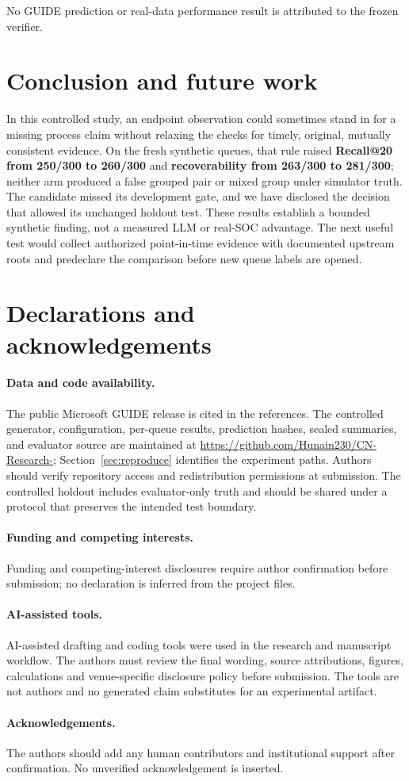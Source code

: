 \documentclass[pdflatex,sn-mathphys-num,iicol]{sn-jnl}
\begin{document}
No GUIDE prediction or real-data performance result is attributed to the frozen verifier.


\section{Conclusion and future work}
In this controlled study, an endpoint observation could sometimes stand in for a missing process claim without relaxing the checks for timely, original, mutually consistent evidence. On the fresh synthetic queues, that rule raised \textbf{Recall@20 from 250/300 to 260/300} and \textbf{recoverability from 263/300 to 281/300}; neither arm produced a false grouped pair or mixed group under simulator truth. The candidate missed its development gate, and we have disclosed the decision that allowed its unchanged holdout test. These results establish a bounded synthetic finding, not a measured LLM or real-SOC advantage. The next useful test would collect authorized point-in-time evidence with documented upstream roots and predeclare the comparison before new queue labels are opened.


\section{Declarations and acknowledgements}
\paragraph{Data and code availability.} The public Microsoft GUIDE release is cited in the references. The controlled generator, configuration, per-queue results, prediction hashes, sealed summaries, and evaluator source are maintained at \url{https://github.com/Hunain230/CN-Research-}; Section~\ref{sec:reproduce} identifies the experiment paths. Authors should verify repository access and redistribution permissions at submission. The controlled holdout includes evaluator-only truth and should be shared under a protocol that preserves the intended test boundary.
\paragraph{Funding and competing interests.} Funding and competing-interest disclosures require author confirmation before submission; no declaration is inferred from the project files.
\paragraph{AI-assisted tools.} AI-assisted drafting and coding tools were used in the research and manuscript workflow. The authors must review the final wording, source attributions, figures, calculations and venue-specific disclosure policy before submission. The tools are not authors and no generated claim substitutes for an experimental artifact.
\paragraph{Acknowledgements.} The authors should add any human contributors and institutional support after confirmation. No unverified acknowledgement is inserted.


\end{document}
